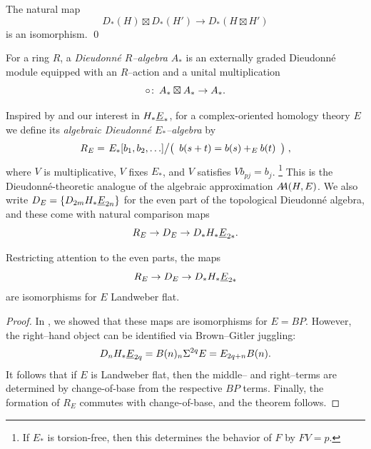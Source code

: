 \begin{lemma}
The natural map \[D_*(H) \boxtimes D_*(H') \to D_*(H \boxtimes H')\] is an isomorphism. \qed
\end{lemma}

\begin{definition}
For a ring \(R\), a \textit{Dieudonn\'e \(R\)--algebra} \(A_*\) is an externally graded Dieudonn\'e module equipped with an \(R\)--action and a unital multiplication \[\circ\co A_* \boxtimes A_* \to A_*.\]
\end{definition}

\begin{example}
Inspired by  and our interest in \(H_* \OS{E}{*}\), for a complex-oriented homology theory \(E\) we define its \textit{algebraic Dieudonn\'e \(E_*\)--algebra} by \[R_E = \left. E_*[b_1, b_2, \ldots] \middle/ \left( \begin{array}{c} b(s+t) = b(s) +_E b(t) \end{array} \right) \right.,\] where \(V\) is multiplicative, \(V\) fixes \(E_*\), and \(V\) satisfies \(Vb_{pj} = b_j\).%
\footnote{%
If \(E_*\) is torsion-free, then this determines the behavior of \(F\) by \(FV = p\).
}
This is the Dieudonn\'e-theoretic analogue of the algebraic approximation \(\AA(H, E)\).
We also write \(D_E = \{D_{2m} H_* \OS{E}{2n}\}\) for the even part of the topological Dieudonn\'e algebra, and these come with natural comparison maps \[R_E \to D_E \to D_* H_* \OS{E}{2*}.\]
\end{example}

\begin{theorem}\label{LandweberFlatUnstableCoopns}
Restricting attention to the even parts, the maps \[R_E \to D_E \to D_* H_* \OS{E}{2*}\] are isomorphisms for \(E\) Landweber flat.
\end{theorem}
\begin{proof}
In , we showed that these maps are isomorphisms for \(E = BP\).
However, the right--hand object can be identified via Brown--Gitler juggling: \[D_n H_* \OS{E}{2q} = B(n)_n \Susp^{2q} E = E_{2q+n} B(n).\]
It follows that if \(E\) is Landweber flat, then the middle-- and right--terms are determined by change-of-base from the respective \(BP\) terms.
Finally, the formation of \(R_E\) commutes with change-of-base, and the theorem follows.
\end{proof}

